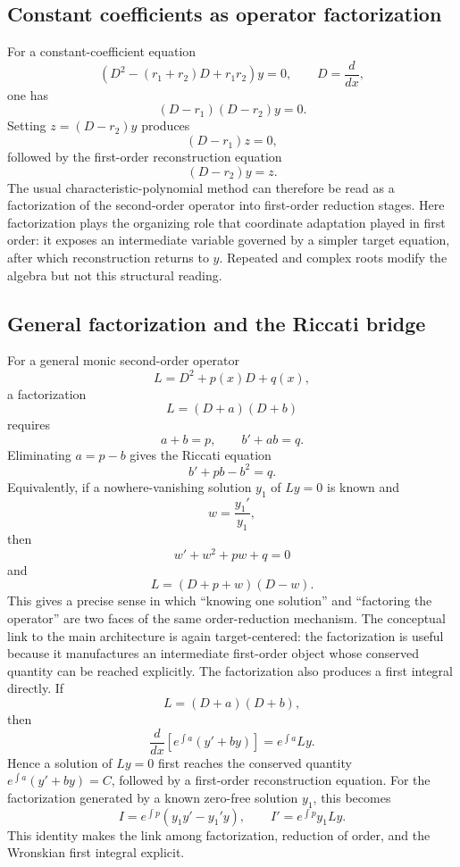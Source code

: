 \documentclass[11pt]{article}
\theoremstyle{definition}
\begin{document}
\subsection*{Constant coefficients as operator factorization}
For a constant-coefficient equation
\[
(D^2-(r_1+r_2)D+r_1r_2)y=0,
\qquad D=\frac{d}{dx},
\]
one has
\[
(D-r_1)(D-r_2)y=0.
\]
Setting \(z=(D-r_2)y\) produces
\[
(D-r_1)z=0,
\]
followed by the first-order reconstruction equation
\[
(D-r_2)y=z.
\]
The usual characteristic-polynomial method can therefore be read as a factorization of the second-order operator into first-order reduction stages. Here factorization plays the organizing role that coordinate adaptation played in first order: it exposes an intermediate variable governed by a simpler target equation, after which reconstruction returns to \(y\). Repeated and complex roots modify the algebra but not this structural reading.

\subsection*{General factorization and the Riccati bridge}
For a general monic second-order operator
\[
L=D^2+p(x)D+q(x),
\]
a factorization
\[
L=(D+a)(D+b)
\]
requires
\[
a+b=p,
\qquad
b'+ab=q.
\]
Eliminating \(a=p-b\) gives the Riccati equation
\[
b'+pb-b^2=q.
\]
Equivalently, if a nowhere-vanishing solution \(y_1\) of \(Ly=0\) is known and
\[
w=\frac{y_1'}{y_1},
\]
then
\[
w'+w^2+pw+q=0
\]
and
\[
\boxed{L=(D+p+w)(D-w).}
\]
This gives a precise sense in which ``knowing one solution'' and ``factoring the operator'' are two faces of the same order-reduction mechanism. The conceptual link to the main architecture is again target-centered: the factorization is useful because it manufactures an intermediate first-order object whose conserved quantity can be reached explicitly. The factorization also produces a first integral directly. If
\[
L=(D+a)(D+b),
\]
then
\[
\frac{d}{dx}\left[e^{\int a}(y'+by)\right]
=e^{\int a}Ly.
\]
Hence a solution of \(Ly=0\) first reaches the conserved quantity \(e^{\int a}(y'+by)=C\), followed by a first-order reconstruction equation. For the factorization generated by a known zero-free solution \(y_1\), this becomes
\[
I=e^{\int p}(y_1y'-y_1'y),
\qquad
I'=e^{\int p}y_1Ly.
\]
This identity makes the link among factorization, reduction of order, and the Wronskian first integral explicit.
\end{document}
